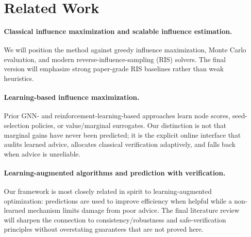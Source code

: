 \section{Related Work}
\label{sec:related}

\paragraph{Classical influence maximization and scalable influence estimation.}
We will position the method against greedy influence maximization, Monte Carlo evaluation, and modern reverse-influence-sampling (RIS) solvers. The final version will emphasize strong paper-grade RIS baselines rather than weak heuristics.

\paragraph{Learning-based influence maximization.}
Prior GNN- and reinforcement-learning-based approaches learn node scores, seed-selection policies, or value/marginal surrogates. Our distinction is not that marginal gains have never been predicted; it is the explicit online interface that audits learned advice, allocates classical verification adaptively, and falls back when advice is unreliable.

\paragraph{Learning-augmented algorithms and prediction with verification.}
Our framework is most closely related in spirit to learning-augmented optimization: predictions are used to improve efficiency when helpful while a non-learned mechanism limits damage from poor advice. The final literature review will sharpen the connection to consistency/robustness and safe-verification principles without overstating guarantees that are not proved here.
